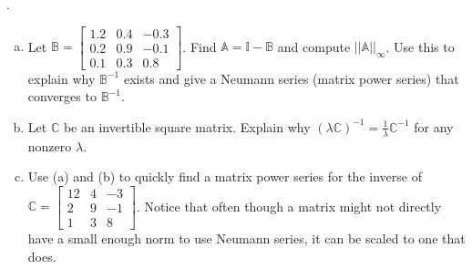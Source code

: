 \documentclass[12 pt]{article}
\begin{document}
  .
  \begin{enumerate}[a)]
\item
Let $\mathbb{B}= \begin{bmatrix} 1.2 & 0.4 & -0.3 \\ 0.2 & 0.9 & -0.1 \\ 0.1 &
0.3 & 0.8 \end{bmatrix}$.
Find $\mathbb{A}=\mathbb{I} - \mathbb{B}$ and compute $||\mathbb{A}||_{\infty}$.
Use this to explain why $\mathbb{B}^{-1}$ exists and give a Neumann series (matrix power series) that converges to $\mathbb{B}^{-1}$.

\noindent
\item
Let $\mathbb{C}$ be an invertible square matrix. Explain why $(\lambda \mathbb{C})^{-1} = \frac{1}{\lambda} \mathbb{C}^{-1}$ for any nonzero
$\lambda$.

\noindent
\item Use (a) and (b) to quickly find a matrix power series for the inverse of
$\mathbb{C}=\begin{bmatrix} 12 & 4 & -3 \\ 2 & 9 & -1 \\ 1 & 3 & 8 \end{bmatrix}$. Notice that often though a matrix might not directly have a small enough norm to use Neumann series, it can be scaled to one that does.

\end{enumerate}
\medskip
    
\end{document}
